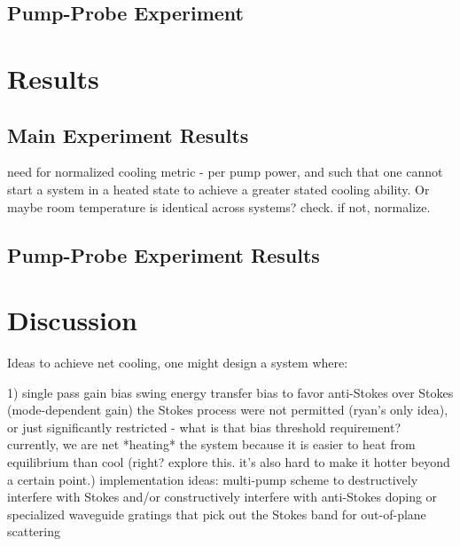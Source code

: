 \subsection{Pump-Probe Experiment}
\label{subsec:Cooling:Setup:Pump-Probe}


\section{Results}
\label{sec:Cooling:Results}


\subsection{Main Experiment Results}
\label{subsec:Cooling:Results:Main}

need for normalized cooling metric - per pump power, and such that one cannot start a system in a heated state to achieve a greater stated cooling ability. Or maybe room temperature is identical across systems? check. if not, normalize.

\subsection{Pump-Probe Experiment Results}
\label{subsec:Cooling:Results:Pump-Probe}


\section{Discussion}
\label{sec:Cooling:Discussion}

Ideas to achieve net cooling, one might design a system where:

1) single pass gain bias
     swing energy transfer bias to favor anti-Stokes over Stokes (mode-dependent gain)
     the Stokes process were not permitted (ryan's only idea), or just significantly restricted - what is that bias threshold requirement?
     currently, we are net *heating* the system because it is easier to heat from equilibrium than cool (right? explore this. it's also hard to make it hotter beyond a certain point.)
     implementation ideas:
       multi-pump scheme to destructively interfere with Stokes and/or constructively interfere with anti-Stokes
       doping or specialized waveguide gratings that pick out the Stokes band for out-of-plane scattering

